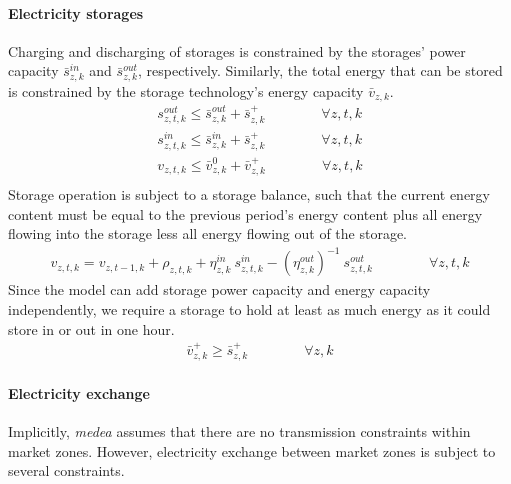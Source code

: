 \documentclass[11pt,a4paper]{article}
\begin{document}
\paragraph{Electricity storages}
Charging and discharging of storages is constrained by the storages' power capacity $\bar{s}^{in}_{z,k}$ and $\bar{s}^{out}_{z,k}$, respectively. Similarly, the total energy that can be stored is constrained by the storage technology's energy capacity $\bar{v}_{z,k}$.
\begin{align}
s^{out}_{z,t,k} \leq \bar{s}^{out}_{z,k} + \bar{s}^{+}_{z,k} \qquad \qquad \forall z,t,k \\
s^{in}_{z,t,k} \leq \bar{s}^{in}_{z,k} + \bar{s}^{+}_{z,k} \qquad \qquad \forall z,t,k \\
v_{z,t,k} \leq \bar{v}^{0}_{z,k} + \bar{v}^{+}_{z,k} \qquad \qquad \forall z,t,k \\
\end{align}
Storage operation is subject to a storage balance, such that the current energy content must be equal to the previous period's energy content plus all energy flowing into the storage less all energy flowing out of the storage.
\begin{align}
v_{z,t,k} = v_{z,t-1,k} + \rho_{z,t,k} + \eta^{in}_{z,k} \: s^{in}_{z,t,k} - (\eta^{out}_{z,k})^{-1} \: s^{out}_{z,t,k} \qquad \qquad \forall z,t,k
\end{align}
Since the model can add storage power capacity and energy capacity independently, we require a storage to hold at least as much energy as it could store in or out in one hour.
\begin{align}
\bar{v}^{+}_{z,k} \geq \bar{s}^{+}_{z,k} \qquad \qquad \forall z,k
\end{align}

\paragraph{Electricity exchange}
Implicitly, \emph{medea} assumes that there are no transmission constraints within market zones. 
However, electricity exchange between market zones is subject to several constraints.
\end{document}
